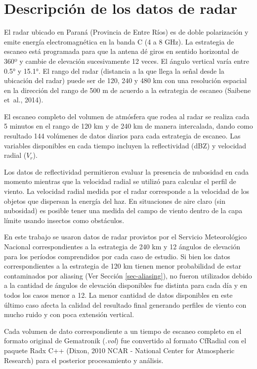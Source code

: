 \documentclass[12pt,spanish,oneside, a4paper]{book}
\begin{document}
\section{Descripción de los datos de
radar}\label{descripcion-de-los-datos-de-radar}

El radar ubicado en Paraná (Provincia de Entre Ríos) es de doble
polarización y emite energía electromagnética en la banda C (4 a 8 GHz).
La estrategia de escaneo está programada para que la antena dé giros en
sentido horizontal de 360º y cambie de elevación sucesivamente 12 veces.
El ángulo vertical varía entre 0.5° y 15.1°. El rango del radar
(distancia a la que llega la señal desde la ubicación del radar) puede
ser de 120, 240 y 480 km con una resolución espacial en la dirección del
rango de 500 m de acuerdo a la estrategia de escaneo (Saibene et~al.,
2014).

El escaneo completo del volumen de atmósfera que rodea al radar se
realiza cada 5 minutos en el rango de 120 km y de 240 km de manera
intercalada, dando como resultado 144 volúmenes de datos diarios para
cada estrategia de escaneo. Las variables disponibles en cada tiempo
incluyen la reflectividad (dBZ) y velocidad radial (\(V_r\)).

Los datos de reflectividad permitieron evaluar la presencia de nubosidad
en cada momento mientras que la velocidad radial se utilizó para
calcular el perfil de viento. La velocidad radial medida por el radar
corresponde a la velocidad de los objetos que dispersan la energía del
haz. En situaciones de aire claro (sin nubosidad) es posible tener una
medida del campo de viento dentro de la capa límite usando insectos como
obstáculos.

En este trabajo se usaron datos de radar provistos por el Servicio
Meteorológico Nacional correspondientes a la estrategia de 240 km y 12
ángulos de elevación para los períodos comprendidos por cada caso de
estudio. Si bien los datos correspondientes a la estrategia de 120 km
tienen menor probabilidad de estar contaminados por aliasing (Ver
Sección \ref{sec-aliasing}), no fueron utilizados debido a la cantidad
de ángulos de elevación disponibles fue distinta para cada día y en
todos los casos menor a 12. La menor cantidad de datos disponibles en
este último caso afecta la calidad del resultado final generando
perfiles de viento con mucho ruido y con poca extensión vertical.

Cada volumen de dato correspondiente a un tiempo de escaneo completo en
el formato original de Gematronik (\emph{.vol}) fue convertido al
formato CfRadial con el paquete Radx C++ (Dixon, 2010 NCAR - National
Center for Atmospheric Research) para el posterior procesamiento y
análisis.
\end{document}
